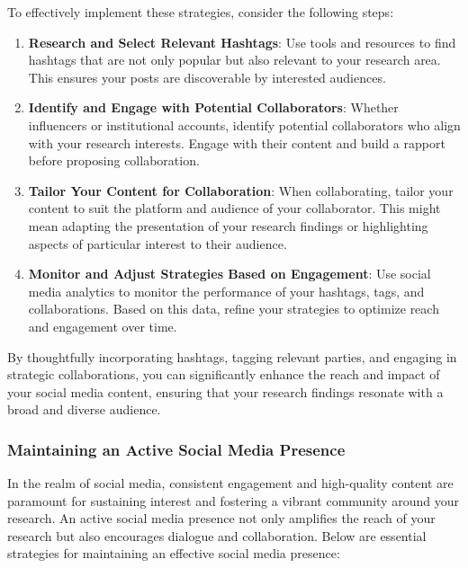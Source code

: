 \documentclass[
]{book}
\begin{document}
To effectively implement these strategies, consider the following steps:

\begin{enumerate}
\def\labelenumi{\arabic{enumi}.}
\item
  \textbf{Research and Select Relevant Hashtags}: Use tools and resources to find hashtags that are not only popular but also relevant to your research area. This ensures your posts are discoverable by interested audiences.
\item
  \textbf{Identify and Engage with Potential Collaborators}: Whether influencers or institutional accounts, identify potential collaborators who align with your research interests. Engage with their content and build a rapport before proposing collaboration.
\item
  \textbf{Tailor Your Content for Collaboration}: When collaborating, tailor your content to suit the platform and audience of your collaborator. This might mean adapting the presentation of your research findings or highlighting aspects of particular interest to their audience.
\item
  \textbf{Monitor and Adjust Strategies Based on Engagement}: Use social media analytics to monitor the performance of your hashtags, tags, and collaborations. Based on this data, refine your strategies to optimize reach and engagement over time.
\end{enumerate}

By thoughtfully incorporating hashtags, tagging relevant parties, and engaging in strategic collaborations, you can significantly enhance the reach and impact of your social media content, ensuring that your research findings resonate with a broad and diverse audience.

\hypertarget{maintaining-an-active-social-media-presence}{%
\subsubsection*{Maintaining an Active Social Media Presence}\label{maintaining-an-active-social-media-presence}}

In the realm of social media, consistent engagement and high-quality content are paramount for sustaining interest and fostering a vibrant community around your research. An active social media presence not only amplifies the reach of your research but also encourages dialogue and collaboration. Below are essential strategies for maintaining an effective social media presence:
\end{document}
